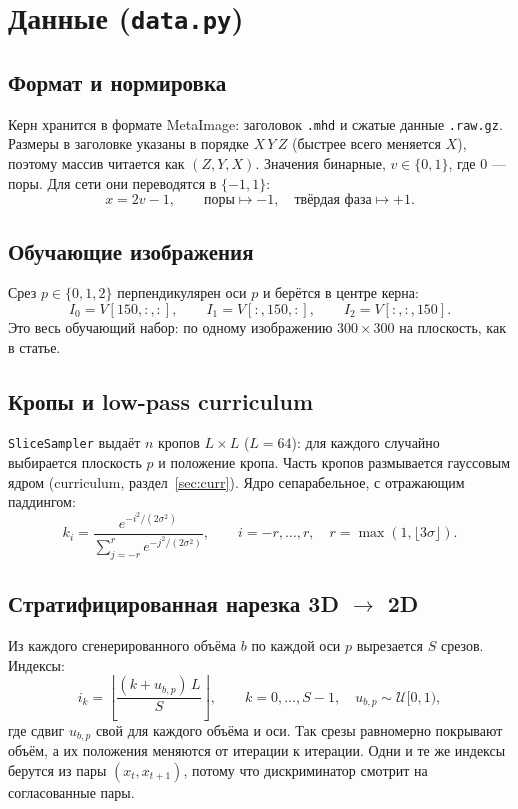 \documentclass[11pt,a4paper]{article}
\newcommand{\code}[1]{\texttt{#1}}
\begin{document}
\section{Данные (\code{data.py})}

\subsection{Формат и нормировка}
Керн хранится в формате MetaImage: заголовок \code{.mhd} и сжатые данные \code{.raw.gz}. Размеры в
заголовке указаны в порядке $X\,Y\,Z$ (быстрее всего меняется $X$), поэтому массив читается как
$(Z,Y,X)$. Значения бинарные, $v\in\{0,1\}$, где $0$ — поры. Для сети они переводятся в $\{-1,1\}$:
\[
  x = 2v - 1,\qquad \text{поры}\mapsto -1,\quad \text{твёрдая фаза}\mapsto +1 .
\]

\subsection{Обучающие изображения}
Срез $p\in\{0,1,2\}$ перпендикулярен оси $p$ и берётся в центре керна:
\[
  I_0 = V[150,:,:],\qquad I_1 = V[:,150,:],\qquad I_2 = V[:,:,150].
\]
Это весь обучающий набор: по одному изображению $300\times300$ на плоскость, как в статье.

\subsection{Кропы и low-pass curriculum}
\code{SliceSampler} выдаёт $n$ кропов $L\times L$ ($L=64$): для каждого случайно выбирается плоскость $p$
и положение кропа. Часть кропов размывается гауссовым ядром (curriculum, раздел~\ref{sec:curr}).
Ядро сепарабельное, с отражающим паддингом:
\[
  k_i = \frac{e^{-i^2/(2\sigma^2)}}{\sum_{j=-r}^{r} e^{-j^2/(2\sigma^2)}},\qquad i=-r,\dots,r,\quad r=\max(1,\lfloor 3\sigma\rfloor).
\]

\subsection{Стратифицированная нарезка 3D $\to$ 2D}
Из каждого сгенерированного объёма $b$ по каждой оси $p$ вырезается $S$ срезов. Индексы:
\[
  i_k = \left\lfloor \frac{(k + u_{b,p})\,L}{S} \right\rfloor,\qquad k=0,\dots,S-1,\quad u_{b,p}\sim\mathcal U[0,1),
\]
где сдвиг $u_{b,p}$ свой для каждого объёма и оси. Так срезы равномерно покрывают объём, а их положения
меняются от итерации к итерации. Одни и те же индексы берутся из пары $(x_t, x_{t+1})$, потому что
дискриминатор смотрит на согласованные пары.
\end{document}
